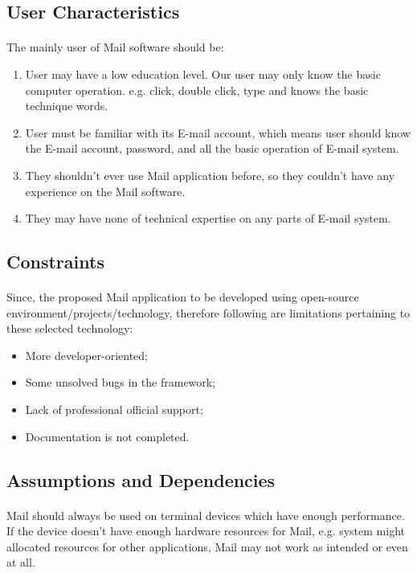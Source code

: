 \documentclass[11pt,a4paper]{article}
\begin{document}
        \subsection{User Characteristics}
        	\paragraph{} The mainly user of Mail software should be:
				\begin{enumerate}
					\item User may have a low education level. Our user may only know the basic computer operation. e.g. click, double click, type and knows the basic technique words.
					\item User must be familiar with its E-mail account, which means user should know the E-mail account, password, and all the basic operation of E-mail system.
					\item They shouldn't ever use Mail application before, so they couldn't have any experience on the Mail software.
					\item They may have none of technical expertise on any parts of E-mail system.
				\end{enumerate}
        \subsection{Constraints}
        	\paragraph{} Since, the proposed Mail application to be developed using open-source environment/projects/technology, therefore following are limitations pertaining to these selected technology:
			\begin{itemize}
				\item More developer-oriented;
				\item Some unsolved bugs in the framework;
				\item Lack of professional official support;
				\item Documentation is not completed.
			\end{itemize}
        \subsection{Assumptions and Dependencies}
        	\paragraph{} Mail should always be used on terminal devices which have enough performance. If the device doesn't have enough hardware resources for Mail, e.g. system might allocated resources for other applications, Mail may not work as intended or even at all.
\end{document}
